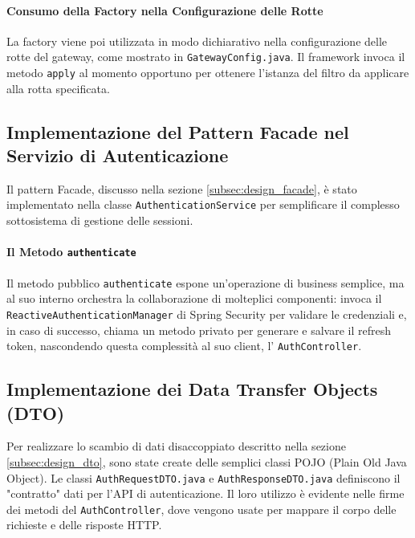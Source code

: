 \documentclass[12pt,a4paper,openright,twoside]{book}
\begin{document}
\paragraph{Consumo della Factory nella Configurazione delle Rotte}
La factory viene poi utilizzata in modo dichiarativo nella configurazione delle rotte del gateway, come mostrato in \texttt{GatewayConfig.java}. Il framework invoca il metodo \texttt{apply} al momento opportuno per ottenere l'istanza del filtro da applicare alla rotta specificata.


\subsection{Implementazione del Pattern Facade nel Servizio di Autenticazione}
\label{subsec:impl_facade}
Il pattern Facade, discusso nella sezione \ref{subsec:design_facade}, è stato implementato nella classe \texttt{AuthenticationService} per semplificare il complesso sottosistema di gestione delle sessioni.

\paragraph{Il Metodo \texttt{authenticate}}
Il metodo pubblico \texttt{authenticate} espone un'operazione di business semplice, ma al suo interno orchestra la collaborazione di molteplici componenti: invoca il \texttt{ReactiveAuthenticationManager} di Spring Security per validare le credenziali e, in caso di successo, chiama un metodo privato per generare e salvare il refresh token, nascondendo questa complessità al suo client, l' \texttt{AuthController}.


\subsection{Implementazione dei Data Transfer Objects (DTO)}
\label{subsec:impl_dto}
Per realizzare lo scambio di dati disaccoppiato descritto nella sezione \ref{subsec:design_dto}, sono state create delle semplici classi POJO (Plain Old Java Object). Le classi \texttt{AuthRequestDTO.java} e \texttt{AuthResponseDTO.java} definiscono il "contratto" dati per l'API di autenticazione. Il loro utilizzo è evidente nelle firme dei metodi del \texttt{AuthController}, dove vengono usate per mappare il corpo delle richieste e delle risposte HTTP.
\end{document}
